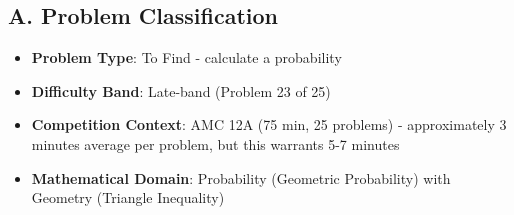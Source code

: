 \documentclass[11pt]{article}
\begin{document}
\begin{problemconfigbox}
\subsection*{A. Problem Classification}
\begin{itemize}[leftmargin=*]
    \item \textbf{Problem Type}: To Find - calculate a probability
    \item \textbf{Difficulty Band}: Late-band (Problem 23 of 25)
    \item \textbf{Competition Context}: AMC 12A (75 min, 25 problems) - approximately 3 minutes average per problem, but this warrants 5-7 minutes
    \item \textbf{Mathematical Domain}: Probability (Geometric Probability) with Geometry (Triangle Inequality)
\end{itemize}


\end{problemconfigbox}
\end{document}
